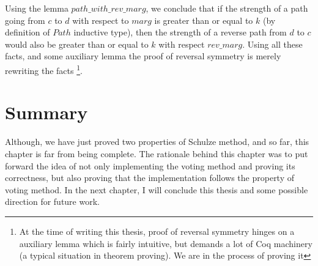 Using the lemma $path\_with\_rev\_marg$, we conclude that if the strength of 
a path going from $c$ to $d$ with respect to $marg$ is greater than or equal to $k$ 
(by definition of $Path$ inductive type), then the strength of a reverse path from $d$ to 
$c$ would also be greater than or equal to $k$ with respect $rev\_marg$. 
Using all these facts, and some auxiliary  lemma 
the proof of reversal symmetry is merely rewriting the facts
\footnote{At the time of writing this thesis, proof of reversal 
symmetry hinges on a auxiliary lemma which 
is fairly intuitive, but demands a lot of  Coq machinery (a typical situation 
in theorem proving). We are in the process of proving it}. 

 	
 
 \section{Summary}
 Although, we have just proved two properties of Schulze method, and so far, this chapter 
 is far from being complete. The rationale behind this chapter was to put forward the idea of 
 not only implementing the voting method and proving its correctness, but also proving that the implementation 
 follows the property of voting method. In the next chapter, I will conclude this thesis and some possible 
 direction for future work.  
 
 
 